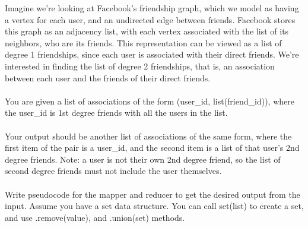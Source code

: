 \begin{blocksection}
\question
Imagine we’re looking at Facebook’s friendship graph, which we model as having a vertex for each user, and an undirected edge between friends. Facebook stores this graph as an adjacency list, with each vertex associated with the list of its neighbors, who are its friends. This representation can be viewed as a list of degree 1 friendships, since each user is associated with their direct friends. We’re interested in finding the list of degree 2 friendships, that is, an association between each user and the friends of their direct friends. \\
\\
You are given a list of associations of the form (user\_id, list(friend\_id)), where the user\_id is 1st degree friends with all the users in the list.\\
\\
Your output should be another list of associations of the same form, where the first item of the pair is a user\_id, and the second item is a list of that user’s 2nd degree friends. Note: a user is not their own 2nd degree friend, so the list of second degree friends must not include the user themselves.\\
 \\
Write pseudocode for the mapper and reducer to get the desired output from the input. Assume you have a set data structure. You can call set(list) to create a set, and use .remove(value), and .union(set) methods. \\

\end{blocksection}